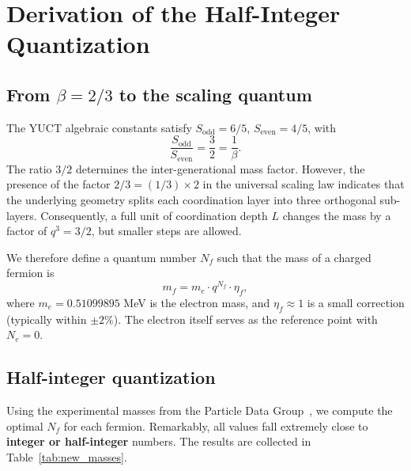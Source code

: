 \documentclass[12pt,a4paper]{article}
\newcommand{\Sodd}{S_{\mathrm{odd}}}
\newcommand{\Seven}{S_{\mathrm{even}}}
\begin{document}
	\section{Derivation of the Half-Integer Quantization}
	
	\subsection{From \(\beta = 2/3\) to the scaling quantum}
	
	The YUCT algebraic constants satisfy \(\Sodd = 6/5\), \(\Seven = 4/5\), with
	\[
	\frac{\Sodd}{\Seven} = \frac{3}{2} = \frac{1}{\beta}.
	\]
	The ratio \(3/2\) determines the inter-generational mass factor. However, the presence of the factor \(2/3 = (1/3) \times 2\) in the universal scaling law indicates that the underlying geometry splits each coordination layer into three orthogonal sub-layers. Consequently, a full unit of coordination depth \(L\) changes the mass by a factor of \(q^3 = 3/2\), but smaller steps are allowed.
	
	We therefore define a quantum number \(N_f\) such that the mass of a charged fermion is
	\begin{equation}
		m_f = m_e \cdot q^{N_f} \cdot \eta_f,
		\label{eq:new}
	\end{equation}
	where \(m_e = 0.51099895\) MeV is the electron mass, and \(\eta_f \approx 1\) is a small correction (typically within \(\pm 2\%\)). The electron itself serves as the reference point with \(N_e = 0\).
	
	\subsection{Half-integer quantization}
	
	Using the experimental masses from the Particle Data Group~\cite{PDG2024}, we compute the optimal \(N_f\) for each fermion. Remarkably, all values fall extremely close to \textbf{integer or half-integer} numbers. The results are collected in Table~\ref{tab:new_masses}.
	
\end{document}
